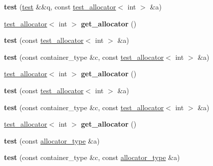\begin{DoxyCompactItemize}
{\bfseries test} (\mbox{\hyperlink{structtest}{test}} \&\&q, const \mbox{\hyperlink{classtest__allocator}{test\+\_\+allocator}}$<$ int $>$ \&a)
\item 
\mbox{\label{structtest_a2c31ee85ae81b89114b3f14daca091cb}} 
\mbox{\hyperlink{classtest__allocator}{test\+\_\+allocator}}$<$ int $>$ {\bfseries get\+\_\+allocator} ()
\item 
\mbox{\label{structtest_a6cbe38c39948288cef13b3f05a759671}} 
{\bfseries test} (const \mbox{\hyperlink{classtest__allocator}{test\+\_\+allocator}}$<$ int $>$ \&a)
\item 
\mbox{\label{structtest_aa241f742953766be8d79e4f2d0b97be5}} 
{\bfseries test} (const container\+\_\+type \&c, const \mbox{\hyperlink{classtest__allocator}{test\+\_\+allocator}}$<$ int $>$ \&a)
\item 
\mbox{\label{structtest_a2c31ee85ae81b89114b3f14daca091cb}} 
\mbox{\hyperlink{classtest__allocator}{test\+\_\+allocator}}$<$ int $>$ {\bfseries get\+\_\+allocator} ()
\item 
\mbox{\label{structtest_a6cbe38c39948288cef13b3f05a759671}} 
{\bfseries test} (const \mbox{\hyperlink{classtest__allocator}{test\+\_\+allocator}}$<$ int $>$ \&a)
\item 
\mbox{\label{structtest_aa241f742953766be8d79e4f2d0b97be5}} 
{\bfseries test} (const container\+\_\+type \&c, const \mbox{\hyperlink{classtest__allocator}{test\+\_\+allocator}}$<$ int $>$ \&a)
\item 
\mbox{\label{structtest_a2c31ee85ae81b89114b3f14daca091cb}} 
\mbox{\hyperlink{classtest__allocator}{test\+\_\+allocator}}$<$ int $>$ {\bfseries get\+\_\+allocator} ()
\item 
\mbox{\label{structtest_a4ecc4aa80f049dc8824bfe0f4ec1bfcb}} 
{\bfseries test} (const \mbox{\hyperlink{classtest__allocator}{allocator\+\_\+type}} \&a)
\item 
\mbox{\label{structtest_a570b32b3abcc801ed80d0ebca4831bcf}} 
{\bfseries test} (const container\+\_\+type \&c, const \mbox{\hyperlink{classtest__allocator}{allocator\+\_\+type}} \&a)

\end{DoxyCompactItemize}
